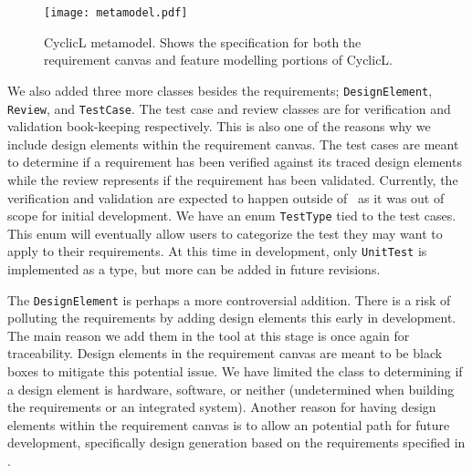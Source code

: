 
\begin{figure}
	\centering
	\texttt{[image: metamodel.pdf]}
	\caption{CyclicL metamodel. Shows the specification for both the requirement canvas and feature modelling portions of CyclicL.}
	\label{fig:metamodel}
\end{figure}

We also added three more classes besides the requirements; \texttt{DesignElement}, \texttt{Review}, and \texttt{TestCase}. The test case and review classes are for verification and validation book-keeping respectively. This is also one of the reasons why we include design elements within the requirement canvas. The test cases are meant to determine if a requirement has been verified against its traced design elements while the review represents if the requirement has been validated. Currently, the verification and validation are expected to happen outside of \tool\ as it was out of scope for initial development. We have an enum \texttt{TestType} tied to the test cases. This enum will eventually allow users to categorize the test they may want to apply to their requirements. At this time in development, only \texttt{UnitTest} is implemented as a type, but more can be added in future revisions.

The \texttt{DesignElement} is perhaps a more controversial addition. There is a risk of polluting the requirements by adding design elements this early in development. The main reason we add them in the tool at this stage is once again for traceability. Design elements in the requirement canvas are meant to be black boxes to mitigate this potential issue. We have limited the class to determining if a design element is hardware, software, or neither (undetermined when building the requirements or an integrated system). Another reason for having design elements within the requirement canvas is to allow an potential path for future development, specifically design generation based on the requirements specified in \tool. 

